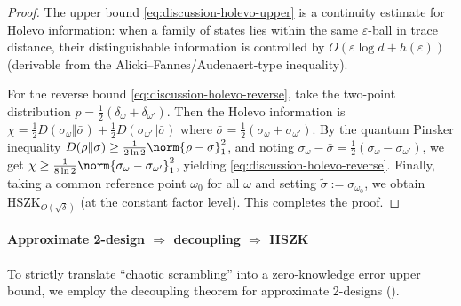 \begin{proof}
The upper bound \eqref{eq:discussion-holevo-upper} is a continuity estimate for Holevo information: when a family of states lies within the same \(\varepsilon\)-ball in trace distance, their distinguishable information is controlled by \(O(\varepsilon\log d+h(\varepsilon))\) (derivable from the Alicki--Fannes/Audenaert-type inequality).
\par
For the reverse bound \eqref{eq:discussion-holevo-reverse}, take the two-point distribution \(p=\frac12(\delta_\omega+\delta_{\omega'})\).
Then the Holevo information is
\(
\chi=\frac12 D(\sigma_\omega\Vert \bar\sigma)+\frac12 D(\sigma_{\omega'}\Vert \bar\sigma)
\)
where \(\bar\sigma=\frac12(\sigma_\omega+\sigma_{\omega'})\).
By the quantum Pinsker inequality \(D(\rho\Vert\sigma)\ge \frac{1}{2\ln 2}\norm{\rho-\sigma}_1^2\), and noting
\(\sigma_\omega-\bar\sigma=\frac12(\sigma_\omega-\sigma_{\omega'})\), we get
\(
\chi\ge \frac{1}{8\ln 2}\norm{\sigma_\omega-\sigma_{\omega'}}_1^2
\), yielding \eqref{eq:discussion-holevo-reverse}.
Finally, taking a common reference point \(\omega_0\) for all \(\omega\) and setting \(\widetilde{\sigma}:=\sigma_{\omega_0}\), we obtain \(\mathrm{HSZK}_{O(\sqrt\delta)}\) (at the constant factor level). This completes the proof.
\end{proof}

\paragraph{Approximate 2-design \texorpdfstring{$\Rightarrow$}{=>} decoupling \texorpdfstring{$\Rightarrow$}{=>} HSZK}
To strictly translate ``chaotic scrambling'' into a zero-knowledge error upper bound, we employ the decoupling theorem for approximate 2-designs (\cite{SzehrDupuisTomamichelRenner2013DecouplingTwoDesigns}).

